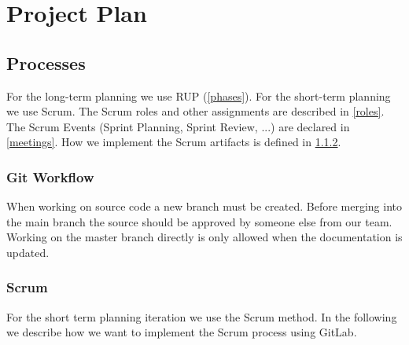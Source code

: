 \chapter{Project Plan}

    
    

\section{Processes}
For the long-term planning we use RUP (\ref{phases}).
For the short-term planning we use Scrum.
The Scrum roles and other assignments are described in \ref{roles}.
The Scrum Events (Sprint Planning, Sprint Review, ...) are declared in \ref{meetings}.
How we implement the Scrum artifacts is defined in \ref{scrum}.

\subsection{Git Workflow}
When working on source code a new branch must be created. Before merging into the main branch the source should be approved by someone else from our team.
Working on the master branch directly is only allowed when the documentation is updated.

\subsection{Scrum}
\label{scrum}
For the short term planning iteration we use the Scrum method.
In the following we describe how we want to implement the Scrum process using GitLab.

